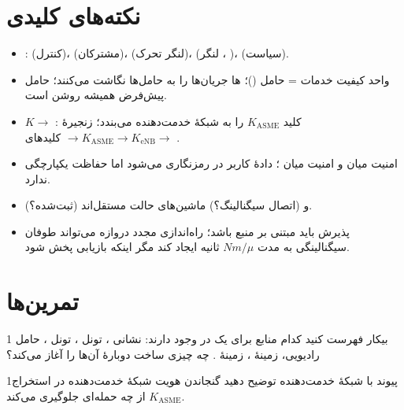 \documentclass[11pt,a4paper]{article}
\begin{document}
\section{نکته‌های کلیدی}
\begin{takeawaybox}
\begin{itemize}
  \item {}:  (کنترل)،  (مشترکان)،  (لنگر تحرک)،  (لنگر ، )،  (سیاست).
  \item واحد کیفیت خدمات = حامل  ()؛ ها جریان‌ها را به حامل‌ها نگاشت می‌کنند؛ حامل پیش‌فرض همیشه روشن است.
  \item {} کلید $K_{\mathrm{ASME}}$ را به شبکهٔ خدمت‌دهنده می‌بندد؛ زنجیرهٔ : $K\to$  $\to K_{\mathrm{ASME}}\to K_{\mathrm{eNB}}\to$ کلیدهای .
  \item امنیت  میان  و امنیت  میان ؛ دادهٔ کاربر در  رمزنگاری می‌شود اما حفاظت یکپارچگی ندارد.
  \item {} (ثبت‌شده؟) و  (اتصال سیگنالینگ؟) ماشین‌های حالت مستقل‌اند.
  \item پذیرش  باید مبتنی بر منبع باشد؛ راه‌اندازی مجدد دروازه می‌تواند طوفان سیگنالینگی به مدت $Nm/\mu$ ثانیه
        ایجاد کند مگر اینکه بازیابی پخش شود.
\end{itemize}
\end{takeawaybox}

\section{تمرین‌ها}

\begin{exercisebox}{1}{ بیکار}\label{exr:idle}
فهرست کنید کدام منابع برای یک  در  وجود دارند: نشانی ، تونل ،
تونل ، حامل رادیویی، زمینهٔ ، زمینهٔ . چه چیزی ساخت دوبارهٔ آن‌ها را آغاز می‌کند؟
\end{exercisebox}

\begin{exercisebox}{1}{پیوند با شبکهٔ خدمت‌دهنده}\label{exr:binding}
توضیح دهید گنجاندن هویت شبکهٔ خدمت‌دهنده در استخراج $K_{\mathrm{ASME}}$ از چه حمله‌ای جلوگیری می‌کند.
\end{exercisebox}
\end{document}
